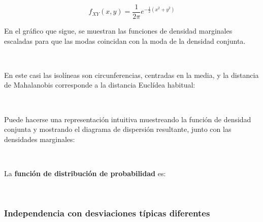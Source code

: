 \documentclass[11pt]{article}
\begin{document}
\[
f_{XY}(x, y)= \frac{1}{2 \pi} e^{-\frac{1}{2}\left(x^2 + y^2 \right)}
\]

En el gráfico que sigue, se muestran las funciones de densidad
marginales escaladas para que las modas coincidan con la moda de la
densidad conjunta.

    \begin{center}
    \end{center}
    { \hspace*{\fill} \\}
    
    En este casi las isolíneas son circunferencias, centradas en la media, y
la distancia de Mahalanobis corresponde a la distancia Euclídea
habitual:

    \begin{center}
    \end{center}
    { \hspace*{\fill} \\}
    
    Puede hacerse una representación intuitiva muestreando la función de
densidad conjunta y mostrando el diagrama de dispersión resultante,
junto con las densidades marginales:

    \begin{center}
    \end{center}
    { \hspace*{\fill} \\}
    
    La \textbf{función de distribución de probabilidad} es:

    \begin{center}
    \end{center}
    { \hspace*{\fill} \\}
    
    \hypertarget{independencia-con-desviaciones-tuxedpicas-diferentes}{%
\subsubsection{Independencia con desviaciones típicas
diferentes}\label{independencia-con-desviaciones-tuxedpicas-diferentes}}
\end{document}
